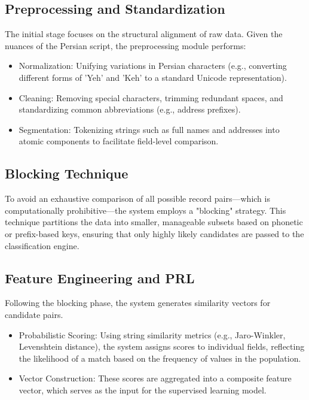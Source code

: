 \documentclass[twoside]{article}
\begin{document}
\subsection{Preprocessing and Standardization}
The initial stage focuses on the structural alignment of raw data. Given the nuances of the Persian script, the preprocessing module performs:
	\begin{itemize}
		\item Normalization: Unifying variations in Persian characters (e.g., converting different forms of 'Yeh' and 'Keh' to a standard Unicode representation).
		\item Cleaning: Removing special characters, trimming redundant spaces, and standardizing common abbreviations (e.g., address prefixes).
		\item Segmentation: Tokenizing strings such as full names and addresses into atomic components to facilitate field-level comparison.
	\end{itemize}
\subsection{Blocking Technique}
To avoid an exhaustive comparison of all possible record pairs—which is computationally prohibitive—the system employs a "blocking" strategy. This technique partitions the data into smaller, manageable subsets based on phonetic or prefix-based keys, ensuring that only highly likely candidates are passed to the classification engine.
\subsection{Feature Engineering and PRL}
Following the blocking phase, the system generates similarity vectors for candidate pairs.
	\begin{itemize}
		\item Probabilistic Scoring: Using string similarity metrics (e.g., Jaro-Winkler, Levenshtein distance), the system assigns scores to individual fields, reflecting the likelihood of a match based on the frequency of values in the population.
		\item Vector Construction: These scores are aggregated into a composite feature vector, which serves as the input for the supervised learning model.
	\end{itemize}
\end{document}
